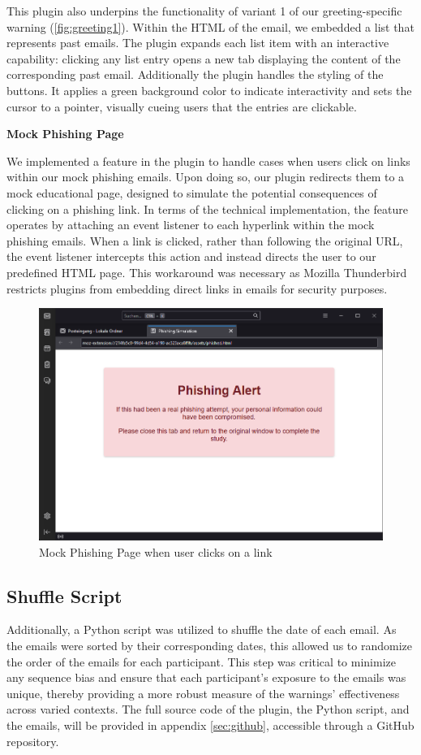 \documentclass[
  a4paper,  %
  twoside,  %
  bibliography=totoc,
  headsepline,
  cleardoublepage=empty,
  parskip=half,
  draft=false
]{scrbook}
\begin{document}
This plugin also underpins the functionality of variant 1 of our greeting-specific warning (\ref{fig:greeting1}). Within the HTML of the email, we embedded a list that represents past emails. The plugin expands each list item with an interactive capability: clicking any list entry opens a new tab displaying the content of the corresponding past email. Additionally the plugin handles the styling of the buttons. It applies a green background color to indicate interactivity and sets the cursor to a pointer, visually cueing users that the entries are clickable. \newpage

\textbf{Mock Phishing Page}

We implemented a feature in the plugin to handle cases when users click on links within our mock phishing emails. Upon doing so, our plugin redirects them to a mock educational page, designed to simulate the potential consequences of clicking on a phishing link. In terms of the technical implementation, the feature operates by attaching an event listener to each hyperlink within the mock phishing emails. When a link is clicked, rather than following the original URL, the event listener intercepts this action and instead directs the user to our predefined HTML page. This workaround was necessary as Mozilla Thunderbird restricts plugins from embedding direct links in emails for security purposes.

\begin{figure} [ht]
    \centering
    \includegraphics[width=1\linewidth]{figures/mockpage.png}
    \caption{Mock Phishing Page when user clicks on a link}
    \label{fig:mock}
\end{figure}


\subsection{Shuffle Script}
Additionally, a Python script was utilized to shuffle the date of each email. As the emails were sorted by their corresponding dates, this allowed us to randomize the order of the emails for each participant. This step was critical to minimize any sequence bias and ensure that each participant's exposure to the emails was unique, thereby providing a more robust measure of the warnings' effectiveness across varied contexts. The full source code of the plugin, the Python script, and the emails, will be provided in appendix \ref{sec:github}, accessible through a GitHub repository.
\end{document}
